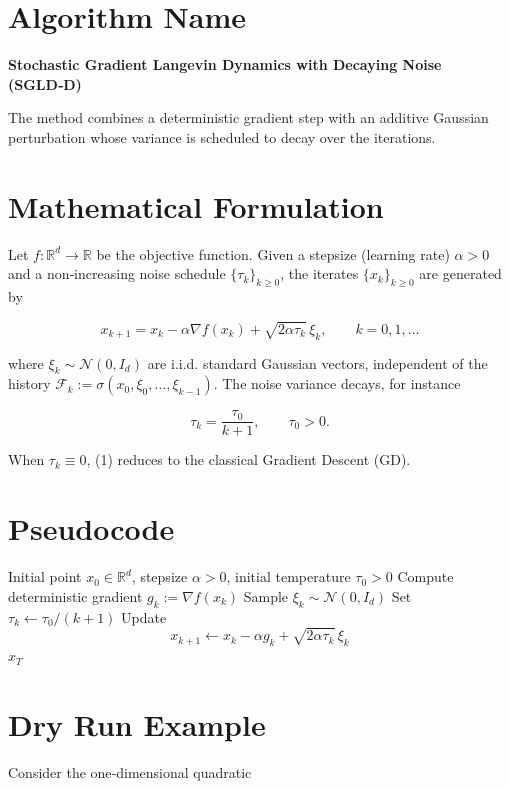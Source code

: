 \documentclass{article}
\newcommand{\RR}{\mathbb{R}}
\begin{document}
\section*{Algorithm Name}
\textbf{Stochastic Gradient Langevin Dynamics with Decaying Noise (SGLD‑D)}  

The method combines a deterministic gradient step with an additive Gaussian perturbation whose variance is scheduled to decay over the iterations.

\section*{Mathematical Formulation}
Let $f:\RR^{d}\rightarrow\RR$ be the objective function.  
Given a stepsize (learning rate) $\alpha>0$ and a non‑increasing noise schedule $\{\tau_k\}_{k\ge 0}$, the iterates $\{x_k\}_{k\ge 0}$ are generated by  

\[
\boxed{
x_{k+1}=x_k-\alpha \nabla f(x_k)+\sqrt{2\alpha \tau_k}\,\xi_k,\qquad k=0,1,\dots
}
\tag{1}
\]

where $\xi_k\sim \mathcal N(0,I_d)$ are i.i.d. standard Gaussian vectors, independent of the history $\mathcal F_k:=\sigma(x_0,\xi_0,\dots,\xi_{k-1})$.  
The noise variance decays, for instance  

\[
\tau_k=\frac{\tau_0}{k+1},\qquad \tau_0>0. \tag{2}
\]

When $\tau_k\equiv 0$, (1) reduces to the classical Gradient Descent (GD).  

\section*{Pseudocode}
\begin{algorithm}[H]
\caption{SGLD‑D}
\begin{algorithmic}[1]
\REQUIRE Initial point $x_0\in\RR^d$, stepsize $\alpha>0$, initial temperature $\tau_0>0$
    \STATE Compute deterministic gradient $g_k:=\nabla f(x_k)$
    \STATE Sample $\xi_k\sim\mathcal N(0,I_d)$
    \STATE Set $\tau_k\gets \tau_0/(k+1)$
    \STATE Update 
    \[
    x_{k+1}\gets x_k-\alpha g_k+\sqrt{2\alpha \tau_k}\,\xi_k
    \]
\ENDFOR
\RETURN $x_T$
\end{algorithmic}
\end{algorithm}

\section*{Dry Run Example}
Consider the one‑dimensional quadratic  
\end{document}
